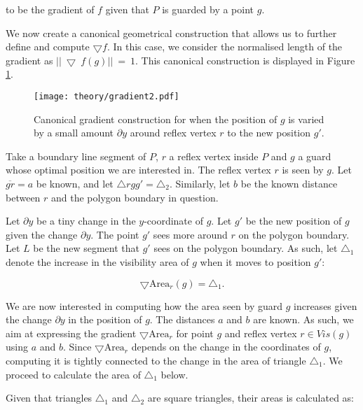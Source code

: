 to be the gradient of $f$ given that $P$ is guarded by a point $g$. 

We  now create a canonical geometrical construction that allows us to further define and compute $\bigtriangledown f$. In this case, we consider the normalised length of the gradient as $||~\bigtriangledown~f(g)||~=~1$. This canonical construction is displayed in Figure \ref{fig:gradient}. 

\begin{figure}[h!]
    \centering
    \texttt{[image: theory/gradient2.pdf]}
    \caption{Canonical gradient construction for when the position of $g$ is varied by a small amount $\partial y$ around reflex vertex $r$ to the new position $g'$.}
    \label{fig:gradient}
\end{figure}

Take a boundary line segment of $P$, $r$ a reflex vertex inside $P$ and $g$ a guard whose optimal position we are interested in. The reflex vertex $r$ is seen by $g$. Let $\overline{gr} = a$ be known, and let $\triangle rgg' = \triangle_2$. Similarly, let $b$ be the known distance between $r$ and the polygon boundary in question.


Let $\partial y$ be a tiny change in the $y$-coordinate of $g$. Let $g'$ be the new position of $g$ given the change $\partial y$. The point $g'$ sees more around $r$ on the polygon boundary. Let $L$ be the new segment that $g'$ sees on the polygon boundary. As such, let $\triangle_1$ denote the increase in the visibility area of $g$ when it moves to position $g'$:

\begin{equation}
    \bigtriangledown \text{Area}_r(g) = \triangle_1. \label{eq:derivative}
\end{equation}

We are now interested in computing how the area seen by guard $g$ increases given the change $\partial y$ in the position of $g$. The distances $a$ and $b$ are known. As such, we aim at expressing the gradient $\bigtriangledown \text{Area}_r$ for point $g$ and reflex vertex $r \in \mathit{Vis}(g)$ using $a$ and $b$. Since $\bigtriangledown \text{Area}_r$ depends on the change in the coordinates of $g$, computing it is tightly connected to the change in the area of triangle $\triangle_1$. We  proceed to calculate the area of $\triangle_1$ below.

Given that triangles $\triangle_1$ and $\triangle_2$ are square triangles, their areas is calculated as:

